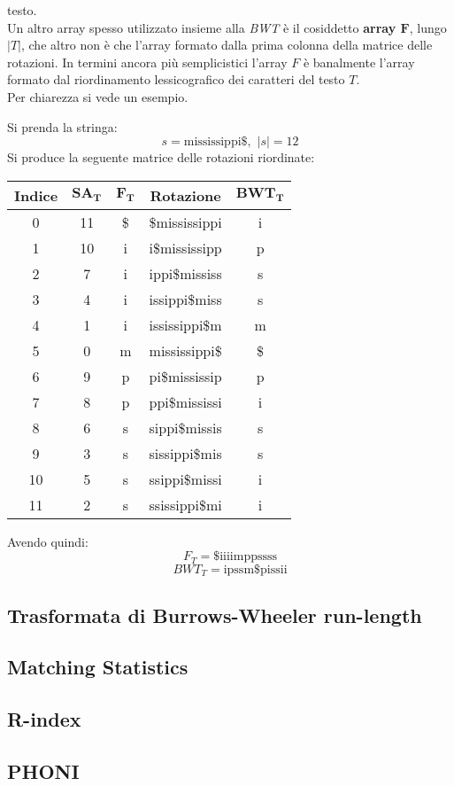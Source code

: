 testo.\\
Un altro array spesso utilizzato insieme alla \textit{BWT} è il cosiddetto
\textbf{array $\mathbf{F}$}, lungo $|T|$, che altro non è che l'array formato
dalla prima colonna della matrice delle rotazioni. In termini ancora più
semplicistici l'array $F$ è banalmente l'array formato dal riordinamento
lessicografico dei caratteri del testo $T$.\\
Per chiarezza si vede un esempio. 
\begin{esempio}
   Si prenda la stringa:
  \[s=\mbox{mississippi\$},\,\,|s|=12\]
  Si produce la seguente matrice delle rotazioni riordinate:
  \begin{table}[H]
    \centering
    \footnotesize
    \begin{tabular}{c|c|c|c|c} 
      \textbf{Indice} & $\mathbf{SA_T}$ & $\mathbf{F_T}$ & \textbf{Rotazione}
      & $\mathbf{BWT_T}$\\ 
      \hline
      0 & 11 & \$ & \$mississippi & i\\
      1 & 10 & i & i\$mississipp & p\\
      2 & 7 & i & ippi\$mississ & s\\
      3 & 4 & i & issippi\$miss & s\\
      4 & 1 & i & ississippi\$m & m\\
      5 & 0 & m & mississippi\$ & \$\\
      6 & 9 & p & pi\$mississip & p\\
      7 & 8 & p & ppi\$mississi & i\\
      8 & 6 & s & sippi\$missis & s\\
      9 & 3 & s & sissippi\$mis & s\\
      10 & 5 & s & ssippi\$missi & i\\
      11 & 2 & s & ssissippi\$mi & i\\
    \end{tabular}
  \end{table}
  Avendo quindi:
  \[F_T=\mbox{\$iiiimppssss}\]
  \[BWT_T=\mbox{ipssm\$pissii}\]
\end{esempio}
\subsection{Trasformata di Burrows-Wheeler run-length}
\subsection{Matching Statistics}
\subsection{R-index}
\subsection{PHONI}